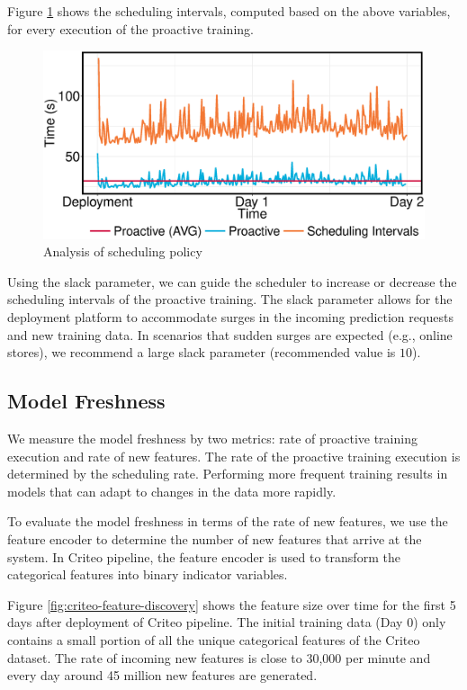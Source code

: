 Figure \ref{fig:scheduling-policy-time}  shows the scheduling intervals, computed based on the above variables, for every execution of the proactive training.

\begin{figure}[h!]
\centering
\includegraphics[width=\columnwidth]{../images/experiment-results/criteo-scheduling-experiment.eps}
\caption{Analysis of scheduling policy}
\label{fig:scheduling-policy-time}
\vspace{2mm}
\end{figure}

Using the slack parameter, we can guide the scheduler to increase or decrease the scheduling intervals of the proactive training.
The slack parameter allows for the deployment platform to accommodate surges in the incoming prediction requests and new training data.
In scenarios that sudden surges are expected (e.g., online stores), we recommend a large slack parameter (recommended value is $10$). 


\subsection{Model Freshness}\label{subsec:model-freshness}
We measure the model freshness by two metrics: rate of proactive training execution and rate of new features.
The rate of the proactive training execution is determined by the scheduling rate.
Performing more frequent training results in models that can adapt to changes in the data more rapidly.

To evaluate the model freshness in terms of the rate of new features, we use the feature encoder to determine the number of new features that arrive at the system.
In Criteo pipeline, the feature encoder is used to transform the categorical features into binary indicator variables.

Figure \ref{fig:criteo-feature-discovery} shows the feature size over time for the first 5 days after deployment of Criteo pipeline.
The initial training data (Day 0) only contains a small portion of all the unique categorical features of the Criteo dataset.
The rate of incoming new features is close to 30,000 per minute and every day around 45 million new features are generated.

